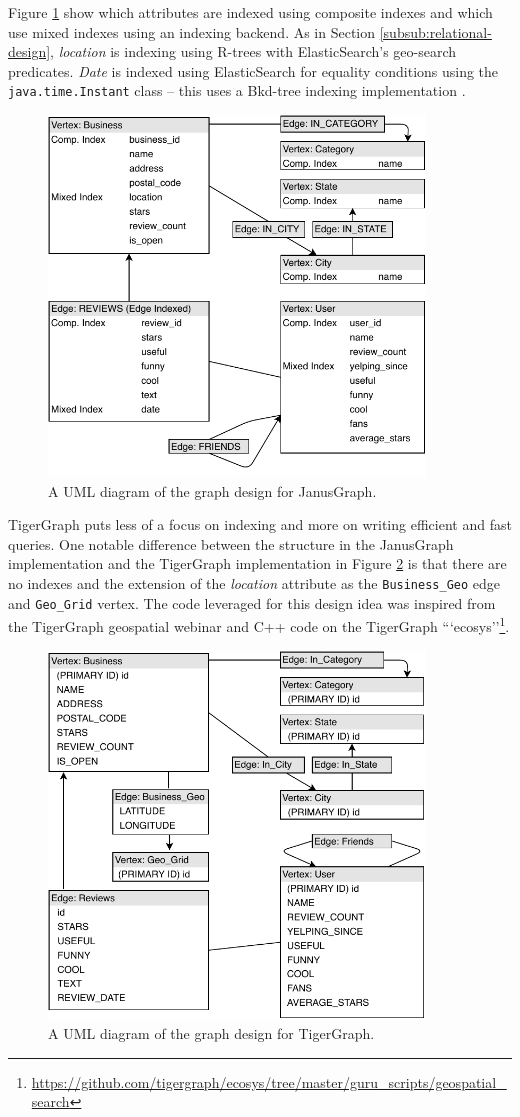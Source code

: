 Figure \ref{fig:janusgraph-design} show which attributes are indexed using composite indexes and which use mixed indexes using an indexing backend. As in Section \ref{subsub:relational-design}, \emph{location} is indexing using R-trees with ElasticSearch's geo-search predicates. \emph{Date} is indexed using ElasticSearch for equality conditions using the \texttt{java.time.Instant} class -- this uses a Bkd-tree indexing implementation \cite{es-bkdtree-index}.

\begin{figure}[h!]
    \centering
    \includegraphics[width=10cm]{img/janus-design.pdf}
    \caption{A UML diagram of the graph design for JanusGraph.}
    \label{fig:janusgraph-design}
\end{figure}

TigerGraph puts less of a focus on indexing and more on writing efficient and fast queries. One notable difference between the structure in the JanusGraph implementation and the TigerGraph implementation in Figure \ref{fig:tigergraph-design} is that there are no indexes and the extension of the \emph{location} attribute as the \texttt{Business\_Geo} edge and \texttt{Geo\_Grid} vertex. The code leveraged for this design idea was inspired from the TigerGraph geospatial webinar \cite{graphgurus} and C++ code on the TigerGraph ```ecosys''\footnote{\url{https://github.com/tigergraph/ecosys/tree/master/guru\_scripts/geospatial\_search}}.

\begin{figure}[h!]
    \centering
    \includegraphics[width=10cm]{img/tigergraph-design.pdf}
    \caption{A UML diagram of the graph design for TigerGraph.}
    \label{fig:tigergraph-design}
\end{figure}


